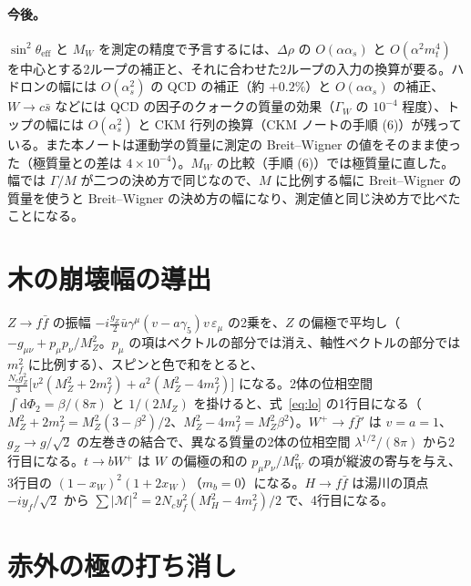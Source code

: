 \documentclass[a4paper,10pt]{ltjsarticle}
\newcommand{\dd}{\mathrm{d}}
\begin{document}
\paragraph{今後。}$\sin^2\theta_{\mathrm{eff}}$ と $M_W$ を測定の精度で予言するには、$\Delta\rho$ の $O(\alpha\alpha_s)$ と $O(\alpha^2m_t^4)$ を中心とする2ループの補正と、それに合わせた2ループの入力の換算が要る。ハドロンの幅には $O(\alpha_s^2)$ の QCD の補正（約 $+0.2\%$）と $O(\alpha\alpha_s)$ の補正、$W\to c\bar s$ などには QCD の因子のクォークの質量の効果（$\Gamma_W$ の $10^{-4}$ 程度）、トップの幅には $O(\alpha_s^2)$ と CKM 行列の換算（CKM ノートの手順 (6)）が残っている。また本ノートは運動学の質量に測定の Breit--Wigner の値をそのまま使った（極質量との差は $4\times10^{-4}$）。$M_W$ の比較（手順 (6)）では極質量に直した。幅では $\Gamma/M$ が二つの決め方で同じなので、$M$ に比例する幅に Breit--Wigner の質量を使うと Breit--Wigner の決め方の幅になり、測定値と同じ決め方で比べたことになる。

\appendix

\section{木の崩壊幅の導出}\label{app:lo}

$Z\to f\bar f$ の振幅 $-i\frac{g_Z}2\bar u\gamma^\mu(v-a\gamma_5)v\,\varepsilon_\mu$ の2乗を、$Z$ の偏極で平均し（$-g_{\mu\nu}+p_\mu p_\nu/M_Z^2$。$p_\mu$ の項はベクトルの部分では消え、軸性ベクトルの部分では $m_f^2$ に比例する）、スピンと色で和をとると、$\frac{N_cg_Z^2}{3}\bigl[v^2(M_Z^2+2m_f^2)+a^2(M_Z^2-4m_f^2)\bigr]$ になる。2体の位相空間 $\int\dd\Phi_2=\beta/(8\pi)$ と $1/(2M_Z)$ を掛けると、式~\eqref{eq:lo} の1行目になる（$M_Z^2+2m_f^2=M_Z^2(3-\beta^2)/2$、$M_Z^2-4m_f^2=M_Z^2\beta^2$）。$W^+\to f\bar f'$ は $v=a=1$、$g_Z\to g/\sqrt2$ の左巻きの結合で、異なる質量の2体の位相空間 $\lambda^{1/2}/(8\pi)$ から2行目になる。$t\to bW^+$ は $W$ の偏極の和の $p_\mu p_\nu/M_W^2$ の項が縦波の寄与を与え、3行目の $(1-x_W)^2(1+2x_W)$（$m_b=0$）になる。$H\to f\bar f$ は湯川の頂点 $-iy_f/\sqrt2$ から $\sum|\mathcal M|^2=2N_cy_f^2(M_H^2-4m_f^2)/2$ で、4行目になる。

\section{赤外の極の打ち消し}\label{app:ir}
\end{document}
